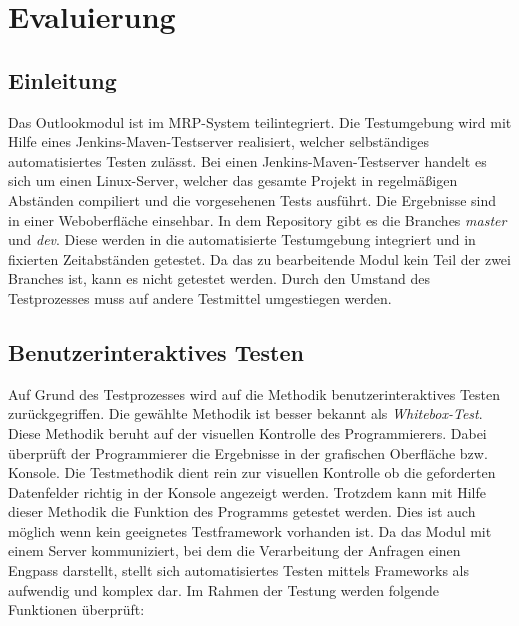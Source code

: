 \chapter{Evaluierung}
\section{Einleitung}
Das Outlookmodul ist im MRP-System teilintegriert. Die Testumgebung wird mit Hilfe eines Jenkins-Maven-Testserver realisiert, welcher selbständiges automatisiertes Testen zulässt. Bei einen Jenkins-Maven-Testserver handelt es sich um einen Linux-Server, welcher das gesamte Projekt in regelmäßigen Abständen compiliert und die vorgesehenen Tests ausführt. Die Ergebnisse sind in einer Weboberfläche einsehbar. In dem Repository gibt es die Branches \textit{master} und \textit{dev}. Diese werden in die automatisierte Testumgebung integriert und in fixierten Zeitabständen getestet. Da das zu bearbeitende Modul kein Teil der zwei Branches ist, kann es nicht getestet werden. Durch den Umstand des Testprozesses muss auf andere Testmittel umgestiegen werden.

\section{Benutzerinteraktives Testen}
Auf Grund des Testprozesses wird auf die Methodik benutzerinteraktives Testen zurückgegriffen. 
Die gewählte Methodik ist besser bekannt als \textit{Whitebox-Test}.\cite{SpillnerLinz05} Diese Methodik beruht auf der visuellen Kontrolle des Programmierers. Dabei überprüft der Programmierer die Ergebnisse in der grafischen Oberfläche bzw. Konsole. Die Testmethodik dient rein zur visuellen Kontrolle ob die geforderten Datenfelder richtig in der Konsole angezeigt werden. Trotzdem kann mit Hilfe dieser Methodik die Funktion des Programms getestet werden. Dies ist auch möglich wenn kein geeignetes Testframework vorhanden ist. Da das Modul mit einem Server  kommuniziert, bei dem die Verarbeitung der Anfragen einen Engpass darstellt, stellt sich automatisiertes Testen mittels Frameworks als aufwendig und komplex dar. 
\newpage
Im Rahmen der Testung werden folgende Funktionen überprüft:\\

